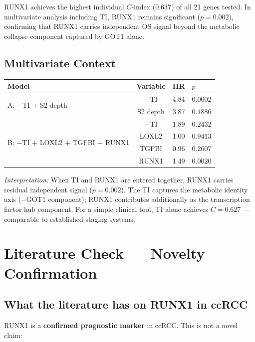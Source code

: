 \documentclass[11pt, a4paper]{article}
\begin{document}
RUNX1 achieves the highest individual
$C$-index ($0.637$) of all 21 genes tested.
In multivariate analysis including TI,
RUNX1 remains significant ($p = 0.002$),
confirming that RUNX1 carries independent
OS signal beyond the metabolic collapse
component captured by GOT1 alone.

\subsection{Multivariate Context}

\begin{center}
\begin{tabular}{lccl}
\toprule
\textbf{Model} & \textbf{Variable} &
\textbf{HR} & \textbf{$p$} \\
\midrule
\multirow{2}{*}{A: $-$TI + S2 depth}
& $-$TI & 4.84 & $0.0002$ \\
& S2 depth & 3.87 & $0.1886$ \\[0.3em]
\multirow{4}{*}{B: $-$TI + LOXL2 + TGFBI
+ RUNX1}
& $-$TI & 1.89 & $0.2432$ \\
& LOXL2  & 1.00 & $0.9413$ \\
& TGFBI  & 0.96 & $0.2607$ \\
& RUNX1  & 1.49 & $\mathbf{0.0020}$ \\
\bottomrule
\end{tabular}
\end{center}

\textit{Interpretation:} When TI and RUNX1
are entered together, RUNX1 carries residual
independent signal ($p = 0.002$). The TI
captures the metabolic identity axis
($-$GOT1 component); RUNX1 contributes
additionally as the transcription factor hub
component. For a simple clinical tool, TI
alone achieves $C = 0.627$ --- comparable
to established staging systems.

\section{Literature Check --- Novelty
Confirmation}
\label{sec:litcheck}

\subsection{What the literature has on
RUNX1 in ccRCC}

RUNX1 is a \textbf{confirmed prognostic
marker} in ccRCC. This is not a novel claim:
\end{document}
